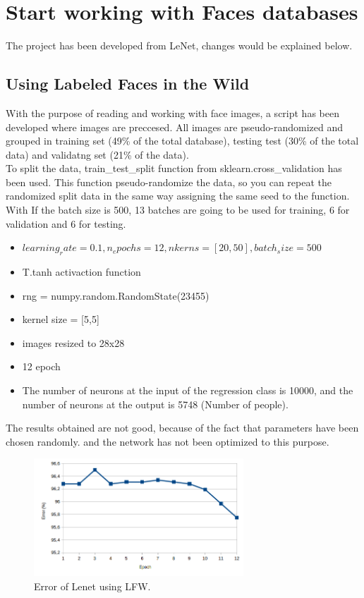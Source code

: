 \clearpage
\section{Start working with Faces databases}
The project has been developed from LeNet, changes would be explained below.\\

\subsection{Using Labeled Faces in the Wild}
With the purpose of reading and working with face images, a script has been developed where images are preccesed. All images are pseudo-randomized and grouped in  training set (49\% of the total database), testing test (30\% of the total data) and validatng set (21\% of the data).\\

To split the data, train\_test\_split function from sklearn.cross\_validation has been used. This function pseudo-randomize the data, so you can repeat the randomized split data in the same way assigning the same seed to the function.\\

With If the batch size is 500, 13 batches are going to be used for training, 6 for validation and 6 for testing.\\

\begin{itemize}
\item $learning_rate=0.1, n_epochs=12, nkerns=[20, 50], batch_size=500$
\item  T.tanh activaction function
\item rng = numpy.random.RandomState(23455)
\item kernel size = [5,5]
\item images resized to 28x28
\item 12 epoch
\item The number of neurons at the input of the regression class is 10000, and the number of neurons at the output is 5748 (Number of people).
\end{itemize}

The results obtained are not good, because of the fact that parameters have been chosen randomly. and the network has not been optimized to this purpose.\\

\begin{figure}[htb]
\centering
\includegraphics[width=0.7\textwidth]{images/epoch_LFW.png}
\caption{Error of Lenet using LFW.} \label{fig:LENETLFW}
\end{figure}

